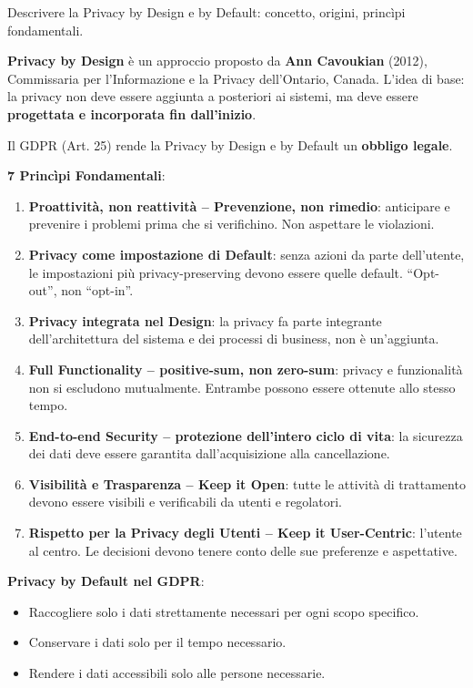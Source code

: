 \documentclass[a4paper,11pt]{article}
\begin{document}
\begin{domanda}
Descrivere la Privacy by Design e by Default: concetto, origini, princìpi fondamentali.
\end{domanda}

\textbf{Privacy by Design} \`{e} un approccio proposto da \textbf{Ann Cavoukian} (2012), Commissaria per l'Informazione e la Privacy dell'Ontario, Canada. L'idea di base: la privacy non deve essere aggiunta a posteriori ai sistemi, ma deve essere \textbf{progettata e incorporata fin dall'inizio}.

Il GDPR (Art. 25) rende la Privacy by Design e by Default un \textbf{obbligo legale}.

\textbf{7 Princìpi Fondamentali}:
\begin{enumerate}
  \item \textbf{Proattivit\`{a}, non reattivit\`{a} -- Prevenzione, non rimedio}: anticipare e prevenire i problemi prima che si verifichino. Non aspettare le violazioni.
  \item \textbf{Privacy come impostazione di Default}: senza azioni da parte dell'utente, le impostazioni pi\`{u} privacy-preserving devono essere quelle default. ``Opt-out'', non ``opt-in''.
  \item \textbf{Privacy integrata nel Design}: la privacy fa parte integrante dell'architettura del sistema e dei processi di business, non \`{e} un'aggiunta.
  \item \textbf{Full Functionality -- positive-sum, non zero-sum}: privacy e funzionalit\`{a} non si escludono mutualmente. Entrambe possono essere ottenute allo stesso tempo.
  \item \textbf{End-to-end Security -- protezione dell'intero ciclo di vita}: la sicurezza dei dati deve essere garantita dall'acquisizione alla cancellazione.
  \item \textbf{Visibilit\`{a} e Trasparenza -- Keep it Open}: tutte le attivit\`{a} di trattamento devono essere visibili e verificabili da utenti e regolatori.
  \item \textbf{Rispetto per la Privacy degli Utenti -- Keep it User-Centric}: l'utente al centro. Le decisioni devono tenere conto delle sue preferenze e aspettative.
\end{enumerate}

\textbf{Privacy by Default nel GDPR}:
\begin{itemize}
  \item Raccogliere solo i dati strettamente necessari per ogni scopo specifico.
  \item Conservare i dati solo per il tempo necessario.
  \item Rendere i dati accessibili solo alle persone necessarie.
\end{itemize}
\end{document}
